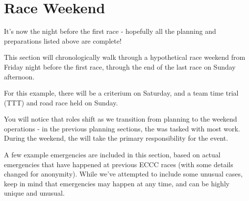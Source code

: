 \section{Race Weekend}

It's now the night before the first race - hopefully all the planning and preparations listed above are complete!

This section will chronologically walk through a hypothetical race weekend from Friday night before the first race,
through the end of the last race on Sunday afternoon.

For this example, there will be a criterium on Saturday,
and a team time trial (TTT) %
and road race held on Sunday.

You will notice that roles shift as we transition from planning to the weekend operations -
in the previous planning sections, the  was tasked with most work.
During the weekend, the  will take the primary responsibility for the event.

A few example emergencies are included in this section, based on actual emergencies that have happened at previous ECCC races
(with some details changed for anonymity).
While we've attempted to include some unusual cases, keep in mind that emergencies may happen at any time, and can be highly unique and unusual.







